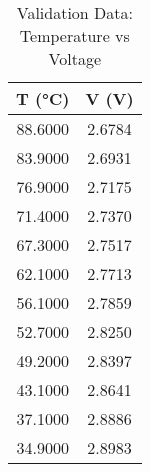 \documentclass[journal]{IEEEtran}
\begin{document}
\begin{table}[h!]
\centering
\begin{tabular}{|c|c|}\hline

\textbf{T (°C)} & \textbf{V (V)} \\\hline

88.6000 & 2.6784 \\\hline

83.9000 & 2.6931 \\\hline

76.9000 & 2.7175 \\\hline

71.4000 & 2.7370 \\\hline

67.3000 & 2.7517 \\\hline

62.1000 & 2.7713 \\\hline

56.1000 & 2.7859 \\\hline

52.7000 & 2.8250 \\\hline

49.2000 & 2.8397 \\\hline

43.1000 & 2.8641 \\\hline

37.1000 & 2.8886 \\\hline

34.9000 & 2.8983 \\
\hline
\end{tabular}
\caption{Validation Data: Temperature vs Voltage}
\label{tab:validation_data}
\end{table}
\end{document}
